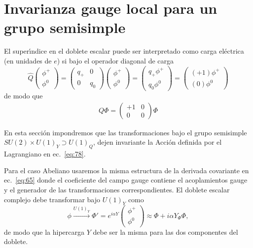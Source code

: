 \section{Invarianza gauge local para un grupo semisimple}
\label{sec:invar-gauge-local-1}
El super\'\i ndice en el doblete escalar puede ser interpretado como carga el\'ectrica (en unidades de $e$) si bajo el operador diagonal de carga
\begin{equation}
\label{eq:79}
  \hat{Q}\begin{pmatrix}
    \phi^+\\
    \phi^0
  \end{pmatrix}=
  \begin{pmatrix}
    q_+&0\\
    0&q_0
  \end{pmatrix}
\begin{pmatrix}
    \phi^+\\
    \phi^0
  \end{pmatrix}=\begin{pmatrix}
    q_+\phi^+\\
    q_0\phi^0
  \end{pmatrix}=\begin{pmatrix}
    (+1)\phi^+\\
    (0)\phi^0
  \end{pmatrix}
\end{equation}
de modo que
\begin{align}
  \label{eq:185}
  Q\Phi=\begin{pmatrix}
    +1&0\\
    0&0
  \end{pmatrix}\Phi
\end{align}

En esta secci\'on impondremos que las transformaciones bajo el grupo semisimple $SU(2)\times U(1)_Y\supset U(1)_Q$, dejen invariante la Acci\'on definida por el Lagrangiano en ec.~\eqref{eq:78}. 

Para el caso Abeliano usaremos la misma estructura de la derivada covariante en ec.~\eqref{eq:65} donde el coeficiente del campo gauge contiene el acoplamientos gauge y el generador de las transformaciones correspondientes. El doblete escalar complejo debe transformar bajo $U(1)_Y$ como
\begin{equation}
  \phi\overset{U(1)_Y}{\to}\Phi'=e^{i\alpha Y}
  \begin{pmatrix}
    \phi^+\\
    \phi^0
  \end{pmatrix}\approx\Phi+i\alpha Y_\Phi\Phi,
\end{equation}
de modo que la hipercarga $Y$ debe ser la misma para las dos componentes del doblete. 

